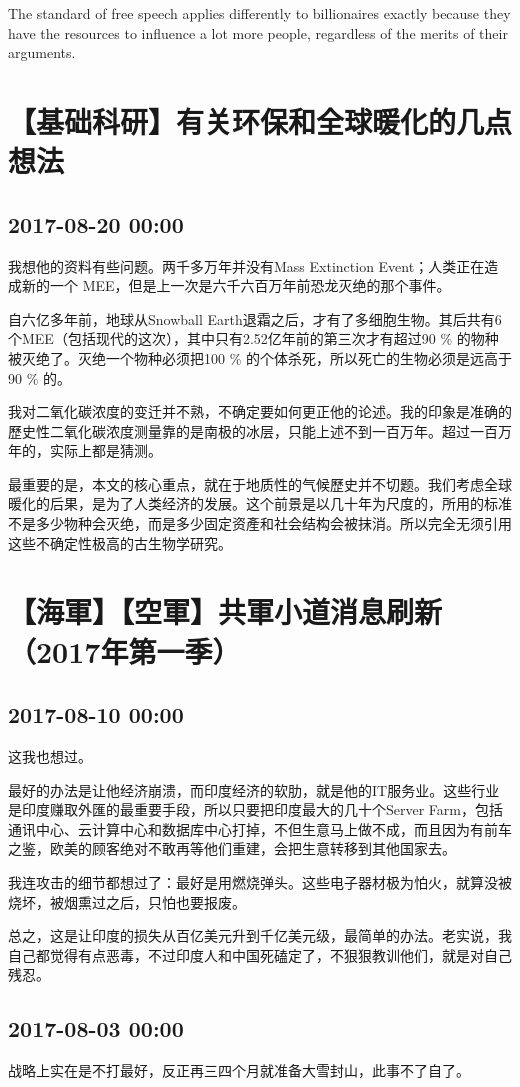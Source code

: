 \documentclass[twocolumn]{ctexart}
\begin{document}
The standard of free speech applies differently to billionaires exactly because they have the resources to influence a lot more people, regardless of the merits of their arguments.\section*{【基础科研】有关环保和全球暖化的几点想法}
\subsection*{2017-08-20 00:00}
我想他的资料有些问题。两千多万年并没有Mass Extinction Event；人类正在造成新的一个 MEE，但是上一次是六千六百万年前恐龙灭绝的那个事件。

自六亿多年前，地球从Snowball Earth退霜之后，才有了多细胞生物。其后共有6个MEE（包括现代的这次），其中只有2.52亿年前的第三次才有超过90 \% 的物种被灭绝了。灭绝一个物种必须把100 \% 的个体杀死，所以死亡的生物必须是远高于90 \% 的。

我对二氧化碳浓度的变迁并不熟，不确定要如何更正他的论述。我的印象是准确的歷史性二氧化碳浓度测量靠的是南极的冰层，只能上述不到一百万年。超过一百万年的，实际上都是猜测。

最重要的是，本文的核心重点，就在于地质性的气候歷史并不切题。我们考虑全球暖化的后果，是为了人类经济的发展。这个前景是以几十年为尺度的，所用的标准不是多少物种会灭绝，而是多少固定资產和社会结构会被抹消。所以完全无须引用这些不确定性极高的古生物学研究。\section*{【海軍】【空軍】共軍小道消息刷新（2017年第一季）}
\subsection*{2017-08-10 00:00}
这我也想过。

最好的办法是让他经济崩溃，而印度经济的软肋，就是他的IT服务业。这些行业是印度赚取外匯的最重要手段，所以只要把印度最大的几十个Server Farm，包括通讯中心、云计算中心和数据库中心打掉，不但生意马上做不成，而且因为有前车之鉴，欧美的顾客绝对不敢再等他们重建，会把生意转移到其他国家去。

我连攻击的细节都想过了：最好是用燃烧弹头。这些电子器材极为怕火，就算没被烧坏，被烟熏过之后，只怕也要报废。

总之，这是让印度的损失从百亿美元升到千亿美元级，最简单的办法。老实说，我自己都觉得有点恶毒，不过印度人和中国死磕定了，不狠狠教训他们，就是对自己残忍。\subsection*{2017-08-03 00:00}
战略上实在是不打最好，反正再三四个月就准备大雪封山，此事不了自了。
\end{document}
